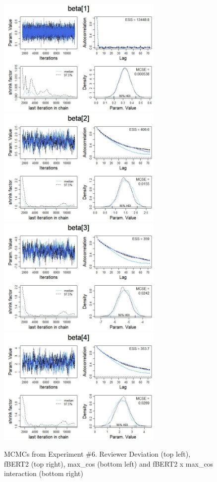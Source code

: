 \begin{figure}
\includegraphics[width=8cm]{experiment_6_1.jpg}
\includegraphics[width=8cm]{experiment_6_2.jpg} \\

\includegraphics[width=8cm]{experiment_6_3.jpg}
\includegraphics[width=8cm]{experiment_6_4.jpg}
\caption{MCMCs from Experiment \#6. Reviewer Deviation (top left), fBERT2 (top right), max\_cos (bottom left) and fBERT2 x max\_cos interaction (bottom right)}
  \label{Exp6MCMC}
\end{figure}





